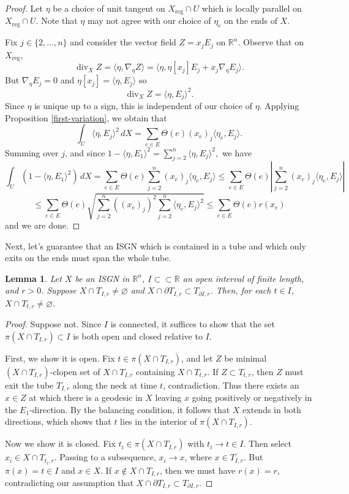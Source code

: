 \documentclass[10pt,a4paper]{amsart}
\newcommand{\on}{\operatorname}
\newcommand{\divv}{\on{div}}
\newcommand{\reg}{\mathrm{reg}}
\newtheorem{lemma}{Lemma}
\begin{document}
\begin{proof}
    Let $\eta$ be a choice of unit tangent on $X_\reg \cap U$ which is locally parallel on $X_\reg \cap U$. Note that $\eta$ may not agree with our choice of $\eta_e$ on the ends of $X$.

    Fix $j \in \{2,\ldots,n\}$ and consider the vector field $Z = x_jE_j$ on $\mathbb{R}^n$. Observe that on $X_\reg$, 
    \[\divv_X Z = \langle \eta, \nabla_\eta Z\rangle = \langle \eta, \eta[x_j] E_j + x_j \nabla_\eta E_j\rangle.\]
    But $\nabla_\eta E_j = 0$ and $\eta[x_j] = \langle \eta,E_j\rangle$ so 
    \[\divv_X Z = \langle \eta,E_j\rangle^2.\]
    Since $\eta$ is unique up to a sign, this is independent of our choice of $\eta$. Applying Proposition \ref{first-variation}, we obtain that 
    \[\int_U \langle \eta,E_j\rangle^2 \, dX = \sum_{e \in E} \Theta(e) (x_e)_j \langle \eta_e,E_j\rangle.\]
    Summing over $j$, and since $1 - \langle \eta,E_1\rangle^2 = \sum_{j=2}^n \langle \eta,E_j\rangle^2,$ we have 
    \[\int_U (1 - \langle \eta,E_1\rangle^2) \, dX = \sum_{e \in E} \Theta(e) \sum_{j=2}^n (x_e)_j \langle \eta_e,E_j\rangle \leq \sum_{e \in E} \Theta(e) \left|\sum_{j=2}^n (x_e)_j \langle \eta_e,E_j\rangle\right| \]
    \[\leq \sum_{e \in E} \Theta(e) \sqrt{\sum_{j=2}^n ((x_e)_j)^2\sum_{j=2}^n \langle \eta_e, E_j\rangle^2} \leq \sum_{e \in E} \Theta(e) r(x_e)\]
    and we are done.
\end{proof}

Next, let's guarantee that an ISGN which is contained in a tube and which only exits on the ends must span the whole tube.

\begin{lemma} \label{spans-tube}
Let $X$ be an ISGN in $\mathbb{R}^n$, $I \subset \subset \mathbb{R}$ an open interval of finite length, and $r > 0$. Suppose $X \cap T_{I,r} \neq \varnothing$ and $X \cap \partial T_{I,r} \subset T_{\partial I, r}$. Then, for each $t \in I$, $X \cap T_{t,r} \neq \varnothing$.  
\end{lemma}
\begin{proof}
    Suppose not. Since $I$ is connected, it suffices to show that the set $\pi(X \cap T_{I,r}) \subset I$ is both open and closed relative to $I$.
    
First, we show it is open. Fix $t \in \pi(X \cap T_{I,r})$, and let $Z$ be minimal $(X \cap T_{I,r})$-clopen set of $X \cap T_{I,r}$ containing $X \cap T_{t,r}$. If $Z \subset T_{t,r}$, then $Z$ must exit the tube $T_{I,r}$ along the neck at time $t$, contradiction. Thus there exists an $x \in Z$ at which there is a geodesic in $X$ leaving $x$ going positively or negatively in the $E_1$-direction. By the balancing condition, it follows that $X$ extends in both directions, which shows that $t$ lies in the interior of $\pi(X \cap T_{I,r})$.

Now we show it is closed. Fix $t_i \in \pi(X \cap T_{I,r})$ with $t_i \to t \in I$. Then select $x_i \in X \cap T_{t_i,r}$. Passing to a subsequence, $x_i \to x$, where $x \in \overline{T_{I,r}}$. But $\pi(x) = t \in I$ and $x \in X$. If $x \notin X \cap T_{I,r}$, then we must have $r(x)=r$, contradicting our assumption that $X \cap \partial T_{I,r} \subset T_{\partial I, r}$.
\end{proof}
\end{document}
